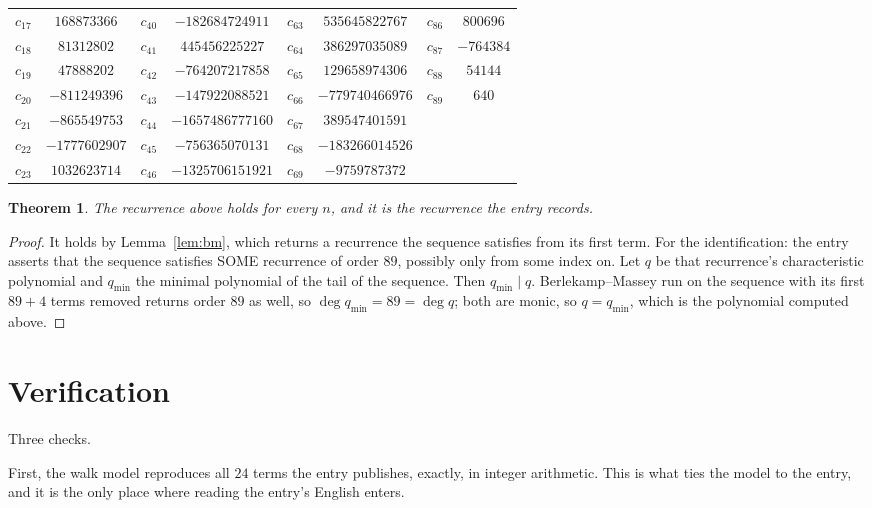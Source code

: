 \documentclass[11pt,a4paper]{article}
\theoremstyle{plain}
\newtheorem{theorem}{Theorem}
\theoremstyle{definition}
\begin{document}
\begin{center}
\begin{tabular}{cccccccc}
$c_{17}$ & $168873366$ & $c_{40}$ & $-182684724911$ & $c_{63}$ & $535645822767$ & $c_{86}$ & $800696$ \\
$c_{18}$ & $81312802$ & $c_{41}$ & $445456225227$ & $c_{64}$ & $386297035089$ & $c_{87}$ & $-764384$ \\
$c_{19}$ & $47888202$ & $c_{42}$ & $-764207217858$ & $c_{65}$ & $129658974306$ & $c_{88}$ & $54144$ \\
$c_{20}$ & $-811249396$ & $c_{43}$ & $-147922088521$ & $c_{66}$ & $-779740466976$ & $c_{89}$ & $640$ \\
$c_{21}$ & $-865549753$ & $c_{44}$ & $-1657486777160$ & $c_{67}$ & $389547401591$ &  &  \\
$c_{22}$ & $-1777602907$ & $c_{45}$ & $-756365070131$ & $c_{68}$ & $-183266014526$ &  &  \\
$c_{23}$ & $1032623714$ & $c_{46}$ & $-1325706151921$ & $c_{69}$ & $-9759787372$ &  &  \\
\end{tabular}
\end{center}

\begin{theorem}
The recurrence above holds for every $n$, and it is the recurrence the entry records.
\end{theorem}

\begin{proof}
It holds by Lemma~\ref{lem:bm}, which returns a recurrence the sequence satisfies from its
first term. For the identification: the entry asserts that the sequence satisfies SOME
recurrence of order $89$, possibly only from some index on. Let $q$ be that recurrence's
characteristic polynomial and $q_{\min}$ the minimal polynomial of the tail of the sequence.
Then $q_{\min}\mid q$. Berlekamp--Massey run on the sequence with its first $89+4$ terms
removed returns order $89$ as well, so $\deg q_{\min}=89=\deg q$; both are monic, so
$q=q_{\min}$, which is the polynomial computed above.
\end{proof}

\section{Verification}

Three checks.

First, the walk model reproduces all $24$ terms the entry publishes, exactly, in integer
arithmetic. This is what ties the model to the entry, and it is the only place where reading
the entry's English enters.
\end{document}
